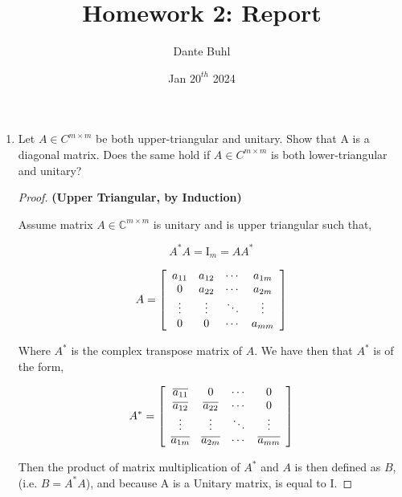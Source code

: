 \documentclass{article}
\title{Homework 2: Report}
\author{Dante Buhl}
\date{Jan $20^{th}$ 2024}
\begin{document}
\newcommand{\bs}[1]{\boldsymbol{#1}}
\newcommand{\bmp}[1]{\begin{minipage}{#1\textwidth}}
\newcommand{\emp}{\end{minipage}}
\newcommand{\R}{\mathbb{R}}
\newcommand{\C}{\mathbb{C}}
\newcommand{\N}{\mathcal{N}}
\newcommand{\I}{\mathrm{I}}
\newcommand{\K}{\bs{\mathrm{K}}}
\newcommand{\m}{\bs{\mu}_*}
\newcommand{\s}{\bs{\Sigma}_*}
\newcommand{\dt}{\Delta t}

\maketitle


\begin{enumerate}

\item
Let $A \in C^{m\times m}$ be both upper-triangular and unitary. Show that A is a
diagonal matrix. Does the same hold if $A \in C^{m\times m}$ is both lower-triangular
and unitary?

\begin{proof}

\textbf{ (Upper Triangular, by Induction)}

Assume matrix $A \in \C^{m \times m}$ is unitary and is upper triangular such that,

\[ 
    A^*A = \mathrm{I}_m = AA^*
\]

\[
    A = \left[\begin{array}{c c c c}
        a_{11} & a_{12} & \cdots & a_{1m} \\
        0 & a_{22} & \cdots & a_{2m} \\
        \vdots & \vdots & \ddots & \vdots \\
        0 & 0 & \cdots  & a_{mm}
        \end{array}\right]
\] 

Where $A^*$ is the complex transpose matrix of $A$. We have then that $A^*$ is of the form, 

\[
    A^* = \left[\begin{array}{c c c c}
        \overline{a_{11}} & 0 & \cdots & 0 \\
        \overline{a_{12}} & \overline{a_{22}} & \cdots & 0 \\
        \vdots & \vdots & \ddots & \vdots \\
        \overline{a_{1m}} & \overline{a_{2m}} & \cdots  & \overline{a_{mm}}
        \end{array}\right]
\] 

Then the product of matrix multiplication of $A^*$ and $A$ is then defined as $B$, (i.e. $B = A^*A$), and because A is a Unitary matrix, is equal to $\mathrm{I}$. 


\end{proof}
\end{enumerate}
\end{document}
